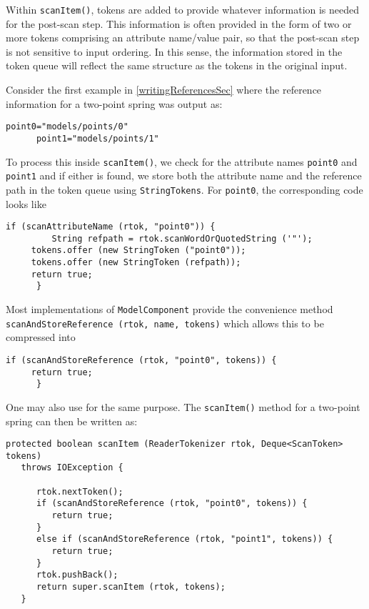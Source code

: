 \documentclass{article}
\begin{document}
Within {\tt scanItem()}, tokens are added to provide whatever
information is needed for the post-scan step.  This information is
often provided in the form of two or more tokens comprising an
attribute name/value pair, so that the post-scan step is not sensitive
to input ordering. In this sense, the information
stored in the token queue will reflect the same structure as the
tokens in the original input.

Consider the first example in \ref{writingReferencesSec}
where the reference information for a two-point spring was output as:
\begin{lstlisting}[]
      point0="models/points/0"
      point1="models/points/1"
\end{lstlisting}
To process this inside {\tt scanItem()}, we check for the attribute
names {\tt point0} and {\tt point1} and if either is found, we store both
the attribute name and the reference path in the token queue using
{\tt StringTokens}.  For {\tt point0}, the corresponding code
looks like
\begin{lstlisting}[]
      if (scanAttributeName (rtok, "point0")) {
         String refpath = rtok.scanWordOrQuotedString ('"');
	 tokens.offer (new StringToken ("point0"));
	 tokens.offer (new StringToken (refpath));
	 return true;
      }
\end{lstlisting}
Most implementations of {\tt ModelComponent}
provide the convenience method {\tt scanAndStoreReference (rtok, name, tokens)}
which allows this to be compressed into
\begin{lstlisting}[]
      if (scanAndStoreReference (rtok, "point0", tokens)) {
	 return true;
      }
\end{lstlisting}
One may also use
for the same purpose.
The {\tt scanItem()} method for a two-point spring can then be written as:
\begin{lstlisting}[]
   protected boolean scanItem (ReaderTokenizer rtok, Deque<ScanToken> tokens)
   throws IOException {

      rtok.nextToken();
      if (scanAndStoreReference (rtok, "point0", tokens)) {
         return true;
      }
      else if (scanAndStoreReference (rtok, "point1", tokens)) {
         return true;
      }
      rtok.pushBack();
      return super.scanItem (rtok, tokens);
   }
\end{lstlisting}
\end{document}
